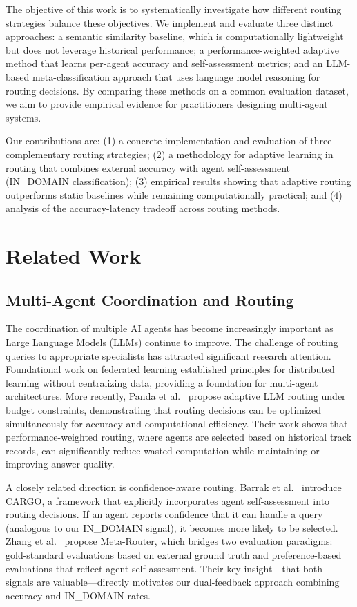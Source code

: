\documentclass[11pt]{article}
\begin{document}
The objective of this work is to systematically investigate how different routing strategies balance these objectives. We implement and evaluate three distinct approaches: a semantic similarity baseline, which is computationally lightweight but does not leverage historical performance; a performance-weighted adaptive method that learns per-agent accuracy and self-assessment metrics; and an LLM-based meta-classification approach that uses language model reasoning for routing decisions. By comparing these methods on a common evaluation dataset, we aim to provide empirical evidence for practitioners designing multi-agent systems.

Our contributions are: (1) a concrete implementation and evaluation of three complementary routing strategies; (2) a methodology for adaptive learning in routing that combines external accuracy with agent self-assessment (IN\_DOMAIN classification); (3) empirical results showing that adaptive routing outperforms static baselines while remaining computationally practical; and (4) analysis of the accuracy-latency tradeoff across routing methods.

\section{Related Work}

\subsection{Multi-Agent Coordination and Routing}

The coordination of multiple AI agents has become increasingly important as Large Language Models (LLMs) continue to improve. The challenge of routing queries to appropriate specialists has attracted significant research attention. Foundational work on federated learning \cite{Brendan2016} established principles for distributed learning without centralizing data, providing a foundation for multi-agent architectures. More recently, Panda et al.\ \cite{Panda2025} propose adaptive LLM routing under budget constraints, demonstrating that routing decisions can be optimized simultaneously for accuracy and computational efficiency. Their work shows that performance-weighted routing, where agents are selected based on historical track records, can significantly reduce wasted computation while maintaining or improving answer quality.

A closely related direction is confidence-aware routing. Barrak et al.\ \cite{Barrak2025} introduce CARGO, a framework that explicitly incorporates agent self-assessment into routing decisions. If an agent reports confidence that it can handle a query (analogous to our IN\_DOMAIN signal), it becomes more likely to be selected. Zhang et al.\ \cite{Zhang2025} propose Meta-Router, which bridges two evaluation paradigms: gold-standard evaluations based on external ground truth and preference-based evaluations that reflect agent self-assessment. Their key insight—that both signals are valuable—directly motivates our dual-feedback approach combining accuracy and IN\_DOMAIN rates.
\end{document}
